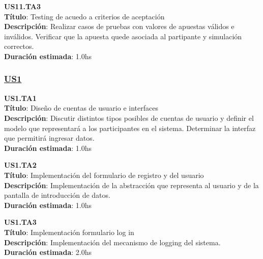 \begin{tcolorbox}
\textbf{US11.TA3} \\
\textbf{Título}: Testing de acuedo a criterios de aceptación \\
\textbf{Descripción}: Realizar casos de pruebas con valores de apuestas válidos e inválidos. Verificar que la apuesta quede asociada al partipante y simulación correctos.\\
\textbf{Duración estimada}: 1.0hs
\end{tcolorbox}
\vspace{10pt}



\subsubsection*{\underline{US1}}

\begin{tcolorbox}
\textbf{US1.TA1} \\
\textbf{Título}: Diseño de cuentas de usuario e interfaces\\
\textbf{Descripción}: Discutir distintos tipos posibles de cuentas de usuario y definir el modelo que representará a los participantes en el sistema. Determinar la interfaz que permitirá ingresar datos.\\
\textbf{Duración estimada}: 1.0hs
\end{tcolorbox}
\vspace{10pt}

\begin{tcolorbox}
\textbf{US1.TA2} \\
\textbf{Título}:  Implementación del formulario de registro y del usuario\\
\textbf{Descripción}: Implementación de la abstracción que representa al usuario y de la pantalla de introducción de datos.\\
\textbf{Duración estimada}: 1.0hs
\end{tcolorbox}
\vspace{10pt}

\begin{tcolorbox}
\textbf{US1.TA3} \\
\textbf{Título}: Implementación formulario log in \\
\textbf{Descripción}: Implementación del mecanismo de logging del sistema.\\
\textbf{Duración estimada}: 2.0hs
\end{tcolorbox}
\vspace{10pt}

